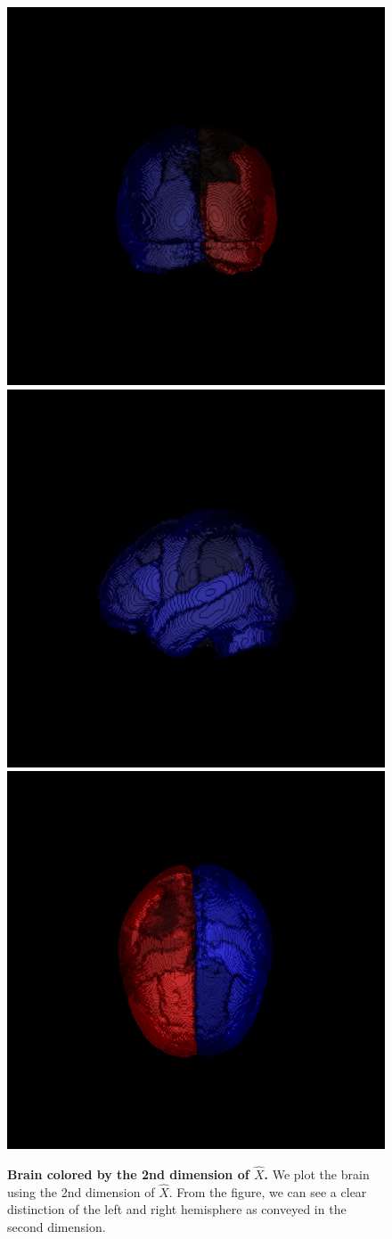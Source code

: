 \documentclass[simplex.tex]{subfiles}
\begin{document}
\begin{figure}[!htbp]
\begin{center}
  \includegraphics[height=.4\linewidth]{../../figs/desikan2.png}\hspace{-50pt}
  \includegraphics[height=.4\linewidth]{../../figs/desikan0.png}\hspace{-50pt}
  \includegraphics[height=.4\linewidth]{../../figs/desikan.png}
\end{center}
\caption{{\bf Brain colored by the 2nd dimension of $\hat{X}$.}
We plot the brain using the 2nd dimension of $\hat{X}$. From the figure, we can see a clear distinction of the left and right hemisphere as conveyed in the second dimension.}
\label{fig:eigenvector_brain}
\end{figure}
\end{document}
